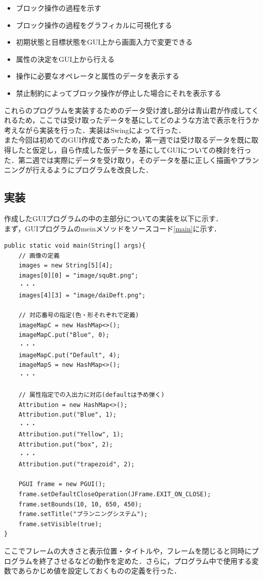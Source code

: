 \documentclass[uplatex,12pt]{jsarticle}
\begin{document}
\begin{itemize}
\item ブロック操作の過程を示す
\item ブロック操作の過程をグラフィカルに可視化する
\item 初期状態と目標状態をGUI上から画面入力で変更できる
\item 属性の決定をGUI上から行える
\item 操作に必要なオペレータと属性のデータを表示する
\item 禁止制約によってブロック操作が停止した場合にそれを表示する
\end{itemize}

これらのプログラムを実装するためのデータ受け渡し部分は青山君が作成してくれるため，ここでは受け取ったデータを基にしてどのような方法で表示を行うか考えながら実装を行った．実装はSwingによって行った．\\

また今回は初めてのGUI作成であったため，第一週では受け取るデータを既に取得したと仮定し，自ら作成した仮データを基にしてGUIについての検討を行った．第二週では実際にデータを受け取り，そのデータを基に正しく描画やプランニングが行えるようにプログラムを改良した．\\

\subsection{実装}
作成したGUIプログラムの中の主部分についての実装を以下に示す．\\

まず，GUIプログラムのmeinメソッドをソースコード\ref{main}に示す．
\begin{lstlisting}[caption=mainメソッド,label=main]
public static void main(String[] args){
	// 画像の定義
	images = new String[5][4];
	images[0][0] = "image/squBt.png";
	・・・
	images[4][3] = "image/daiDeft.png";

	// 対応番号の指定(色・形それぞれで定義)
	imageMapC = new HashMap<>();
	imageMapC.put("Blue", 0);
	・・・
	imageMapC.put("Default", 4);
	imageMapS = new HashMap<>();
	・・・

	// 属性指定での入出力に対応(defaultは予め弾く)
	Attribution = new HashMap<>();
	Attribution.put("Blue", 1);
	・・・
	Attribution.put("Yellow", 1);
	Attribution.put("box", 2);
	・・・
	Attribution.put("trapezoid", 2);

	PGUI frame = new PGUI();
	frame.setDefaultCloseOperation(JFrame.EXIT_ON_CLOSE);
	frame.setBounds(10, 10, 650, 450);
	frame.setTitle("プランニングシステム");
	frame.setVisible(true);
}
\end{lstlisting}
ここでフレームの大きさと表示位置・タイトルや，フレームを閉じると同時にプログラムを終了させるなどの動作を定めた．さらに，プログラム中で使用する変数であらかじめ値を設定しておくものの定義を行った．\\
\end{document}
